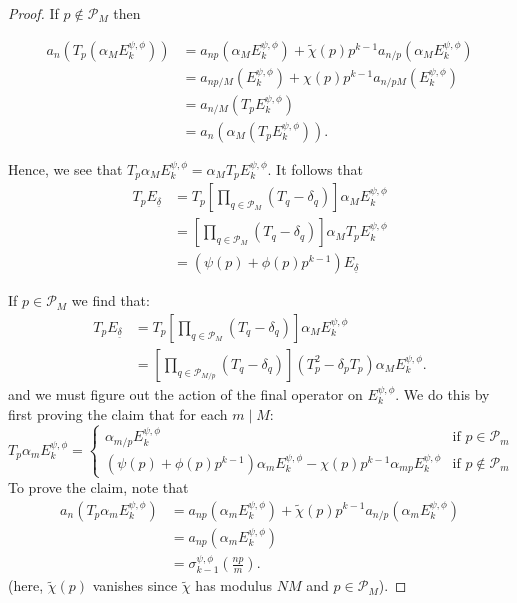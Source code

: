 \documentclass{amsart}
\theoremstyle{plain}
\theoremstyle{definition}
\begin{document}
\begin{proof}
If $p \notin \mathcal{P}_M$ then

\begin{align*}
    a_n(T_p(\alpha_M E_k^{\psi, \phi})) &= a_{np}(\alpha_M E_k^{\psi, \phi}) + \tilde{\chi}(p)p^{k-1}a_{n/p}(\alpha_M E_k^{\psi,\phi}) \\
    &= a_{np/M}(E_k^{\psi,\phi}) + \chi(p)p^{k-1}a_{n/pM}(E_k^{\psi,\phi}) \\
    &= a_{n/M}(T_pE_k^{\psi,\phi}) \\
    &= a_n(\alpha_M (T_p E_k^{\psi,\phi})).
\end{align*}

\noindent Hence, we see that $T_p \alpha_M E_k^{\psi,\phi} = \alpha_M T_p E_k^{\psi,\phi}$. It follows that 
\begin{align*}
    T_pE_{\underline{\delta}}&=T_p \left[\prod_{q\in \mathcal{P}_M} (T_q - \delta_q)\right]\alpha_ME_k^{\psi,\phi} \\
    &=\left[\prod_{q\in \mathcal{P}_M} (T_q - \delta_q)\right]\alpha_M T_pE_k^{\psi,\phi} \\
    &=(\psi(p)+\phi(p)p^{k-1})E_{\underline{\delta}}
\end{align*}

\noindent If $p \in \mathcal{P}_M$ we find that: \begin{align*}T_pE_{\underline{\delta}}&=T_p \left[\prod_{q\in \mathcal{P}_M} (T_q - \delta_q)\right]\alpha_ME_k^{\psi,\phi} \\
    &=\left[\prod_{q\in \mathcal{P}_{M/p}} (T_q - \delta_q)\right](T_p^2-\delta_pT_p)\alpha_M E_k^{\psi,\phi}.\end{align*} and we must figure out the action of the final operator on $E_k^{\psi,\phi}$. We do this by first proving the claim that for each $m\mid M$:
\begin{equation*}
T_p\alpha_m E_k^{\psi, \phi} = 
    \begin{cases}
    \alpha_{m/p}E_k^{\psi,\phi} & \text{if } p \in 
    \mathcal{P}_m \\
    (\psi(p)+\phi(p)p^{k-1})\alpha_{m}E_k^{\psi,\phi}-\chi(p)p^{k-1}\alpha_{mp}E_k^{\psi,\phi} & \text{if } p \notin 
    \mathcal{P}_m
    \end{cases}
\end{equation*}
To prove the claim, note that
\begin{align*}
    a_n(T_p\alpha_m E_k^{\psi,\phi})&=a_{np}(\alpha_m E_k^{\psi,\phi}) + \tilde{\chi}(p)p^{k-1}a_{n/p}(\alpha_m E_k^{\psi,\phi}) \\
    &= a_{np}(\alpha_m E_k^{\psi,\phi}) \\
    &= \sigma_{k-1}^{\psi,\phi}\left(\frac{np}{m}\right).
\end{align*}
(here, $\tilde{\chi}(p)$ vanishes since $\tilde{\chi}$ has modulus $NM$ and $p \in \mathcal{P}_M$).


\end{proof}
\end{document}
